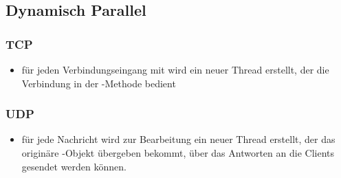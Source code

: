 \subsection{Dynamisch Parallel}


\subsubsection{TCP}

\begin{itemize}
    \item für jeden Verbindungseingang mit  wird ein neuer Thread erstellt, der die Verbindung in der -Methode
    bedient
\end{itemize}


\subsubsection{UDP}

\begin{itemize}
    \item für jede Nachricht wird zur Bearbeitung ein neuer Thread erstellt, der das originäre -Objekt übergeben bekommt,
    über das Antworten an die Clients gesendet werden können.
\end{itemize}
